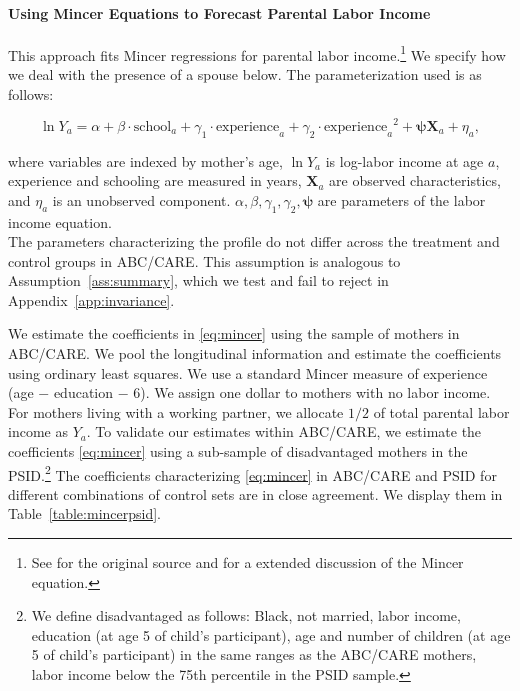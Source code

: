 \paragraph{Using Mincer Equations to Forecast Parental Labor Income} \label{appendix:mincerpar}

\noindent This approach fits Mincer regressions for parental labor income.\footnote{See \citet{Mincer_1974_schooling} for the original source and \citet{Heckman_Lochner_ea_2006_HEE} for a extended discussion of the Mincer equation.} We specify how we deal with the presence of a spouse below. The parameterization used is as follows:

\begin{equation}
\ln Y_{a} = \alpha + \beta \cdot \text{school}_{a} + \gamma_{1}  \cdot \text{experience}_{a} + \gamma_{2} \cdot {\text{experience}_{a}}^2 + \bm{\psi} \mathbf{X}_{a} + \eta_{a}, \label{eq:mincer}
\end{equation}

\noindent where variables are indexed by mother's age, $\ln Y_a$ is log-labor income at age $a$, experience and schooling are measured in years, $ \mathbf{X}_{a}$ are observed characteristics, and $\eta_{a}$ is an unobserved component. $\alpha, \beta, \gamma_{1}, \gamma_{2}, \bm{\psi}$ are parameters of the labor income equation. \\

\noindent The parameters characterizing the profile do not differ across the treatment and control groups in ABC/CARE. This assumption is analogous to Assumption~\ref{ass:summary}, which we test and fail to reject in Appendix~\ref{app:invariance}.

\noindent We estimate the coefficients in \eqref{eq:mincer} using the sample of mothers in ABC/CARE. We pool the longitudinal information and estimate the coefficients using ordinary least squares. We use a standard Mincer measure of experience (age $-$ education $-$ 6). We assign one dollar to mothers with no labor income. For mothers living with a working partner, we allocate $1/2$ of total parental labor income as $Y_{a}$. To validate our estimates within ABC/CARE, we estimate the coefficients \eqref{eq:mincer} using a sub-sample of disadvantaged mothers in the PSID.\footnote{We define disadvantaged as follows: Black, not married, labor income, education (at age 5 of child's participant), age and number of children (at age 5 of child's participant) in the same ranges as the ABC/CARE mothers, labor income below the 75th percentile in the PSID sample.} The coefficients characterizing \eqref{eq:mincer} in ABC/CARE and PSID for different combinations of control sets are in close agreement. We display them in Table~\ref{table:mincerpsid}.

